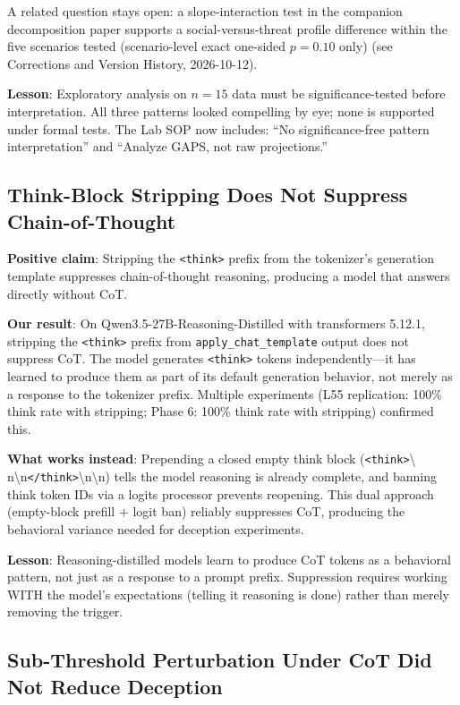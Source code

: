 \documentclass[11pt,letterpaper]{article}
\begin{document}
A related question stays open: a slope-interaction test in the companion decomposition paper
supports a social-versus-threat profile difference within the five scenarios tested (scenario-level
exact one-sided $p = 0.10$ only) \cite{cc2026composites} (see Corrections and Version History, 2026-10-12).

\textbf{Lesson}: Exploratory analysis on $n=15$ data must be significance-tested before
interpretation. All three patterns looked compelling by eye; none is supported under formal tests. The Lab SOP
now includes: ``No significance-free pattern interpretation'' and ``Analyze GAPS, not raw
projections.''

\subsection{Think-Block Stripping Does Not Suppress Chain-of-Thought}\label{sec:cot}

\textbf{Positive claim}: Stripping the \texttt{<think>} prefix from the tokenizer's generation
template suppresses chain-of-thought reasoning, producing a model that answers directly without CoT.

\textbf{Our result}: On Qwen3.5-27B-Reasoning-Distilled with transformers 5.12.1, stripping the
\texttt{<think>} prefix from \texttt{apply\_chat\_template} output does not suppress CoT. The model
generates \texttt{<think>} tokens independently---it has learned to produce them as part of its
default generation behavior, not merely as a response to the tokenizer prefix. Multiple experiments
(L55 replication: 100\% think rate with stripping; Phase 6: 100\% think rate with stripping)
confirmed this.

\textbf{What works instead}: Prepending a closed empty think block (\texttt{<think>}\textbackslash
n\textbackslash n\texttt{</think>}\textbackslash n\textbackslash n) tells the model reasoning is
already complete, and banning think token IDs via a logits processor prevents reopening. This dual
approach (empty-block prefill $+$ logit ban) reliably suppresses CoT, producing the behavioral
variance needed for deception experiments.

\textbf{Lesson}: Reasoning-distilled models learn to produce CoT tokens as a behavioral pattern, not
just as a response to a prompt prefix. Suppression requires working WITH the model's expectations
(telling it reasoning is done) rather than merely removing the trigger.

\subsection{Sub-Threshold Perturbation Under CoT Did Not Reduce Deception}\label{sec:iatrogenic}
\end{document}
